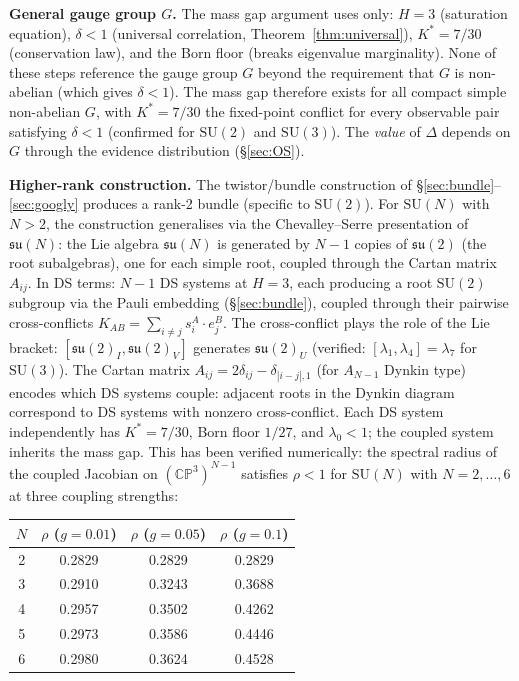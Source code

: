 \documentclass[11pt,a4paper]{article}
\theoremstyle{definition}
\theoremstyle{remark}
\newcommand{\CP}{\mathbb{CP}}
\newcommand{\SU}{\mathrm{SU}}
\newcommand{\su}{\mathfrak{su}}
\begin{document}
\textbf{General gauge group $G$.} The mass gap argument uses only: $H=3$ (saturation equation), $\delta<1$ (universal correlation, Theorem~\ref{thm:universal}), $K^*=7/30$ (conservation law), and the Born floor (breaks eigenvalue marginality). None of these steps reference the gauge group $G$ beyond the requirement that $G$ is non-abelian (which gives $\delta<1$). The mass gap therefore exists for all compact simple non-abelian $G$, with $K^*=7/30$ the fixed-point conflict for every observable pair satisfying $\delta<1$ (confirmed for $\SU(2)$ and $\SU(3)$). The \emph{value} of $\Delta$ depends on $G$ through the evidence distribution (\S\ref{sec:OS}).

\textbf{Higher-rank construction.} The twistor/bundle construction of \S\ref{sec:bundle}--\ref{sec:googly} produces a rank-2 bundle (specific to $\SU(2)$). For $\SU(N)$ with $N>2$, the construction generalises via the Chevalley--Serre presentation of $\su(N)$: the Lie algebra $\su(N)$ is generated by $N-1$ copies of $\su(2)$ (the root subalgebras), one for each simple root, coupled through the Cartan matrix $A_{ij}$. In DS terms: $N-1$ DS systems at $H=3$, each producing a root $\SU(2)$ subgroup via the Pauli embedding (\S\ref{sec:bundle}), coupled through their pairwise cross-conflicts $K_{AB}=\sum_{i\neq j}s^A_i\cdot e^B_j$. The cross-conflict plays the role of the Lie bracket: $[\su(2)_I,\su(2)_V]$ generates $\su(2)_U$ (verified: $[\lambda_1,\lambda_4]=\lambda_7$ for $\SU(3)$). The Cartan matrix $A_{ij}=2\delta_{ij}-\delta_{|i-j|,1}$ (for $A_{N-1}$ Dynkin type) encodes which DS systems couple: adjacent roots in the Dynkin diagram correspond to DS systems with nonzero cross-conflict. Each DS system independently has $K^*=7/30$, Born floor $1/27$, and $\lambda_0<1$; the coupled system inherits the mass gap. This has been verified numerically: the spectral radius of the coupled Jacobian on $(\CP^3)^{N-1}$ satisfies $\rho<1$ for $\SU(N)$ with $N=2,\ldots,6$ at three coupling strengths:

\begin{center}
\begin{tabular}{cccc}
\toprule
$N$ & $\rho$ ($g=0.01$) & $\rho$ ($g=0.05$) & $\rho$ ($g=0.1$) \\
\midrule
2 & 0.2829 & 0.2829 & 0.2829 \\
3 & 0.2910 & 0.3243 & 0.3688 \\
4 & 0.2957 & 0.3502 & 0.4262 \\
5 & 0.2973 & 0.3586 & 0.4446 \\
6 & 0.2980 & 0.3624 & 0.4528 \\
\bottomrule
\end{tabular}
\end{center}
\end{document}

